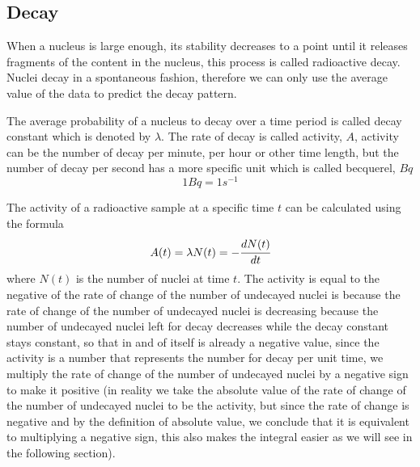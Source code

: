 \documentclass{article}
\begin{document}
\newpage

\subsection{Decay}

When a nucleus is large enough, its stability decreases to a point until it releases fragments of the content in the nucleus, this process is called radioactive decay. Nuclei decay in a spontaneous fashion, therefore we can only use the average value of the data to predict the decay pattern. 

The average probability of a nucleus to decay over a time period is called decay constant which is denoted by $\lambda$. The rate of decay is called activity, $A$, activity can be the number of decay per minute, per hour or other time length, but the number of decay per second has a more specific unit which is called becquerel, $Bq$
$$1Bq=1s^{-1}$$

The activity of a radioactive sample at a specific time $t$ can be calculated using the formula 
\begin{equation}
A(t)=\lambda N(t)=-\cfrac{dN(t)}{dt}
\end{equation}
where $N(t)$ is the number of nuclei at time $t$. The activity is equal to the negative of the rate of change of the number of undecayed nuclei is because the rate of change of the number of undecayed nuclei is decreasing because the number of undecayed nuclei left for decay decreases while the decay constant stays constant, so that in and of itself is already a negative value, since the activity is a number that represents the number for decay per unit time, we multiply the rate of change of the number of undecayed nuclei by a negative sign to make it positive (in reality we take the absolute value of the rate of change of the number of undecayed nuclei to be the activity, but since the rate of change is negative and by the definition of absolute value, we conclude that it is equivalent to multiplying a negative sign, this also makes the integral easier as we will see in the following section).
\end{document}
